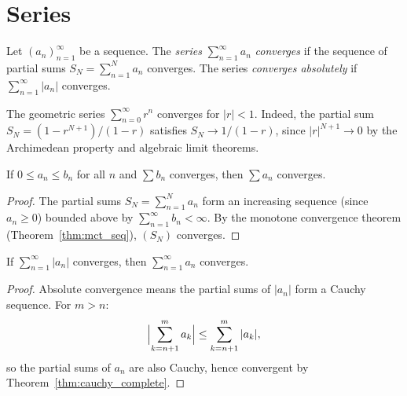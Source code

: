 \documentclass[11pt,a4paper]{article}
\begin{document}
\section{Series}
\label{sec:series}

\begin{definition}
\label{def:series}
Let $(a_n)_{n=1}^\infty$ be a sequence. The \emph{series}
$\sum_{n=1}^\infty a_n$ \emph{converges} if the sequence of partial
sums $S_N = \sum_{n=1}^N a_n$ converges. The series \emph{converges
absolutely} if $\sum_{n=1}^\infty |a_n|$ converges.
\end{definition}

\begin{example}
\label{ex:geometric_series}
The geometric series $\sum_{n=0}^\infty r^n$ converges for $|r| < 1$.
Indeed, the partial sum $S_N = (1 - r^{N+1})/(1 - r)$ satisfies
$S_N \to 1/(1 - r)$, since $|r|^{N+1} \to 0$ by the Archimedean
property and algebraic limit theorems.
\end{example}

\begin{theorem}
\label{thm:comparison}
If $0 \le a_n \le b_n$ for all $n$ and $\sum b_n$ converges, then
$\sum a_n$ converges.
\end{theorem}

\begin{proof}
The partial sums $S_N = \sum_{n=1}^N a_n$ form an increasing sequence
(since $a_n \ge 0$) bounded above by $\sum_{n=1}^\infty b_n < \infty$.
By the monotone convergence theorem (Theorem~\ref{thm:mct_seq}),
$(S_N)$ converges.
\end{proof}

\begin{theorem}
\label{thm:abs_conv}
If $\sum_{n=1}^\infty |a_n|$ converges, then $\sum_{n=1}^\infty a_n$
converges.
\end{theorem}

\begin{proof}
Absolute convergence means the partial sums of $|a_n|$ form a Cauchy
sequence. For $m > n$:
\[
  \Bigl|\sum_{k=n+1}^{m} a_k\Bigr| \le \sum_{k=n+1}^{m} |a_k|,
\]
so the partial sums of $a_n$ are also Cauchy, hence convergent by
Theorem~\ref{thm:cauchy_complete}.
\end{proof}
\end{document}
